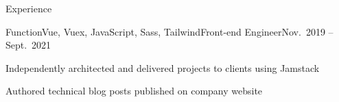 \documentclass{resume} %
\begin{document}
\begin{rSection}{Experience}
\begin{rSubsection}{Function}{Vue, Vuex, JavaScript, Sass, Tailwind}{Front-end Engineer}{Nov.\ 2019 – Sept.\ 2021}
\item Independently architected and delivered projects to clients using Jamstack
\item Authored technical blog posts published on company website
 \end{rSubsection}









\end{rSection}

\end{document}
